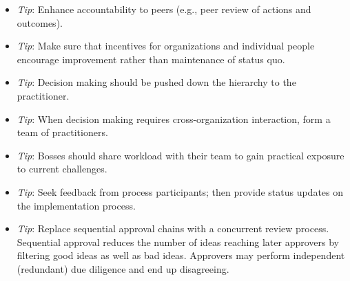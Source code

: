 \begin{itemize}
\item \textit{Tip}: Enhance accountability to peers (e.g., peer review of actions and outcomes).
\item \textit{Tip}: Make sure that incentives for organizations and individual people encourage improvement rather than maintenance of status quo.
\item \textit{Tip}: Decision making should be pushed down the hierarchy to the practitioner.
\item \textit{Tip}: When decision making requires cross-organization interaction, form a team of practitioners.
\item \textit{Tip}: Bosses should share workload with their team to gain practical exposure to current challenges.
\item \textit{Tip}: Seek feedback from process participants; then provide status updates on the implementation process.

\item \textit{Tip}: Replace sequential approval chains with a concurrent review process. Sequential approval reduces the number of ideas reaching later approvers by filtering good ideas as well as bad ideas. Approvers may perform independent (redundant) due diligence and end up disagreeing. 
\end{itemize}
